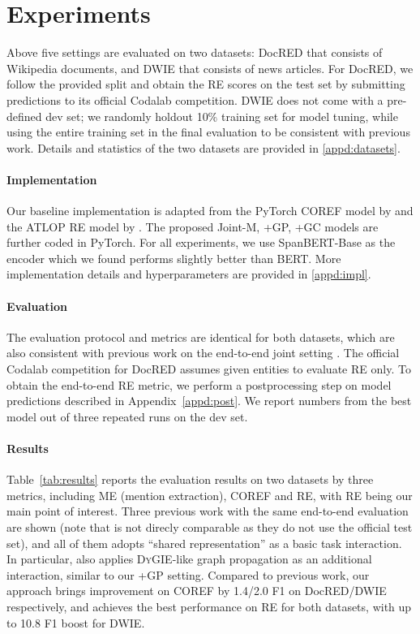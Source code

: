 \documentclass[11pt]{article}
\begin{document}
 \section{Experiments}
\label{sec:experiments}

Above five settings are evaluated on two datasets: DocRED \citep{docred} that consists of Wikipedia documents, and DWIE \citep{dwie} that consists of news articles.
For DocRED, we follow the provided split and obtain the RE scores on the test set by submitting predictions to its official Codalab competition.
DWIE does not come with a pre-defined dev set; we randomly holdout 10\% training set for model tuning, while using the entire training set in the final evaluation to be consistent with previous work.
Details and statistics of the two datasets are provided in \ref{appd:datasets}.

\paragraph{Implementation}
Our baseline implementation is adapted from the PyTorch COREF model by \citet{xu-choi-2020-revealing} and the ATLOP RE model by \citet{atlop}. The proposed Joint-M, +GP, +GC models are further coded in PyTorch. For all experiments, we use SpanBERT-Base \citep{spanbert} as the encoder which we found performs slightly better than BERT. More implementation details and hyperparameters are provided in \ref{appd:impl}.

\paragraph{Evaluation}
The evaluation protocol and metrics are identical for both datasets, which are also consistent with previous work on the end-to-end joint setting \citep{joint-mil,joint-kb}.
The official Codalab competition for DocRED assumes given entities to evaluate RE only. To obtain the end-to-end RE metric, we perform a postprocessing step on model predictions described in Appendix~\ref{appd:post}. We report numbers from the best model out of three repeated runs on the dev set.

\paragraph{Results}
Table~\ref{tab:results} reports the evaluation results on two datasets by three metrics, including ME (mention extraction), COREF and RE, with RE being our main point of interest. 
Three previous work with the same end-to-end evaluation are shown (note that \citet{joint-mil} is not direcly comparable as they do not use the official test set), and all of them adopts ``shared representation'' as a basic task interaction. In particular, \citet{dwie} also applies D\textsc{y}GIE-like graph propagation as an additional interaction, similar to our +GP setting. 
Compared to previous work, our approach brings improvement on COREF by 1.4/2.0 F1 on DocRED/DWIE respectively, and achieves the best performance on RE for both datasets, with up to 10.8 F1 boost for DWIE.
\end{document}
